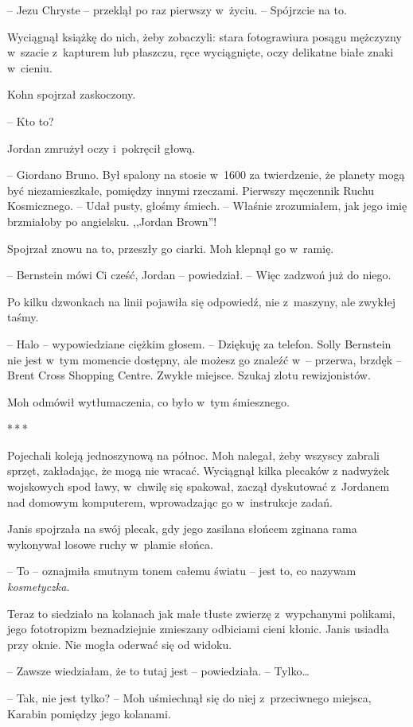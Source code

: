 \documentclass[oneside,polish,11pt,sfheadings]{mwbk}
\newcommand{\threeast}{\bigskip\par\centerline{*\,*\,*}\medskip\par}%
\begin{document}
-- Jezu Chryste -- przeklął po raz pierwszy w~życiu. -- Spójrzcie na to.

Wyciągnął książkę do nich, żeby zobaczyli: stara fotograwiura posągu
mężczyzny w~szacie z~kapturem lub płaszczu, ręce wyciągnięte, oczy
delikatne białe znaki w~cieniu.

Kohn spojrzał zaskoczony. 

-- Kto to?

Jordan zmrużył oczy i~pokręcił głową.

-- Giordano Bruno. Był spalony na stosie w~1600 za twierdzenie, że
planety mogą być niezamieszkałe, pomiędzy innymi rzeczami. Pierwszy
męczennik Ruchu Kosmicznego. -- Udał pusty, głośmy śmiech. -- Właśnie
zrozumiałem, jak jego imię brzmiałoby po angielsku. ,,Jordan Brown''!

Spojrzał znowu na to, przeszły go ciarki. Moh klepnął go w~ramię.

-- Bernstein mówi Ci cześć, Jordan -- powiedział. -- Więc zadzwoń już do
niego.

Po kilku dzwonkach na linii pojawiła się odpowiedź, nie z~maszyny, ale
zwykłej taśmy. 

-- Halo -- wypowiedziane ciężkim głosem. -- Dziękuję za
telefon. Solly Bernstein nie jest w~tym momencie dostępny, ale możesz go
znaleźć w~-- przerwa, brzdęk -- Brent Cross Shopping Centre. Zwykłe
miejsce. Szukaj zlotu rewizjonistów.

Moh odmówił wytłumaczenia, co było w~tym śmiesznego.
  \threeast 

Pojechali koleją jednoszynową na północ. Moh nalegał, żeby wszyscy
zabrali sprzęt, zakładając, że mogą nie wracać. Wyciągnął kilka plecaków
z nadwyżek wojskowych spod ławy, w~chwilę się spakował, zaczął
dyskutować z~Jordanem nad domowym komputerem, wprowadzając go w~instrukcje zadań.

Janis spojrzała na swój plecak, gdy jego zasilana słońcem zginana rama
wykonywał losowe ruchy w~plamie słońca. 

-- To -- oznajmiła smutnym tonem
całemu światu -- jest to, co nazywam \emph{kosmetyczka}.

Teraz to siedziało na kolanach jak małe tłuste zwierzę z~wypchanymi
polikami, jego fototropizm beznadziejnie zmieszany odbiciami cieni
kłonic. Janis usiadła przy oknie. Nie mogła oderwać się od widoku.

-- Zawsze wiedziałam, że to tutaj jest -- powiedziała. -- Tylko\ldots

-- Tak, nie jest tylko? -- Moh uśmiechnął się do niej z~przeciwnego
miejsca, Karabin pomiędzy jego kolanami.
\end{document}
